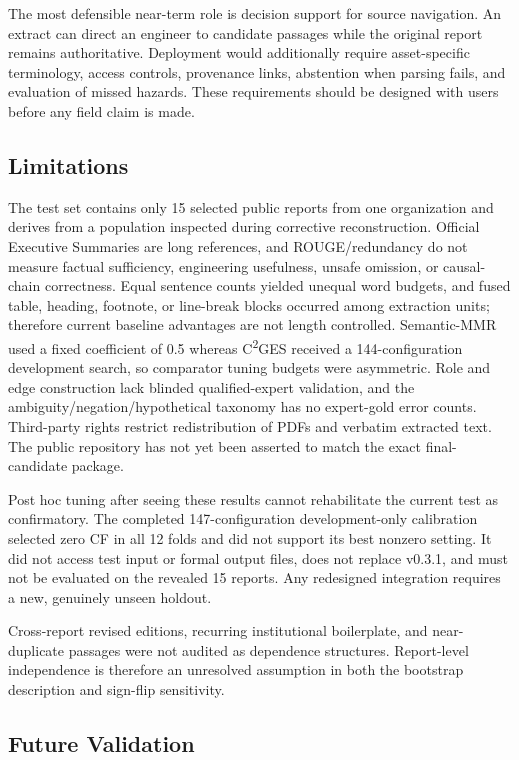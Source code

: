\documentclass[applsci,article,submit,moreauthors]{Definitions/mdpi}
\newcommand{\cges}{C\textsuperscript{2}GES}
\begin{document}
The most defensible near-term role is decision support for source navigation. An extract can direct an engineer to candidate passages while the original report remains authoritative. Deployment would additionally require asset-specific terminology, access controls, provenance links, abstention when parsing fails, and evaluation of missed hazards. These requirements should be designed with users before any field claim is made.

\subsection{Limitations}

The test set contains only 15 selected public reports from one organization and derives from a population inspected during corrective reconstruction. Official Executive Summaries are long references, and ROUGE/redundancy do not measure factual sufficiency, engineering usefulness, unsafe omission, or causal-chain correctness. Equal sentence counts yielded unequal word budgets, and fused table, heading, footnote, or line-break blocks occurred among extraction units; therefore current baseline advantages are not length controlled. Semantic-MMR used a fixed coefficient of 0.5 whereas \cges{} received a 144-configuration development search, so comparator tuning budgets were asymmetric. Role and edge construction lack blinded qualified-expert validation, and the ambiguity/negation/hypothetical taxonomy has no expert-gold error counts. Third-party rights restrict redistribution of PDFs and verbatim extracted text. The public repository has not yet been asserted to match the exact final-candidate package.

Post hoc tuning after seeing these results cannot rehabilitate the current test as confirmatory. The completed 147-configuration development-only calibration selected zero CF in all 12 folds and did not support its best nonzero setting. It did not access test input or formal output files, does not replace v0.3.1, and must not be evaluated on the revealed 15 reports. Any redesigned integration requires a new, genuinely unseen holdout.

Cross-report revised editions, recurring institutional boilerplate, and near-duplicate passages were not audited as dependence structures. Report-level independence is therefore an unresolved assumption in both the bootstrap description and sign-flip sensitivity.

\subsection{Future Validation}
\end{document}
